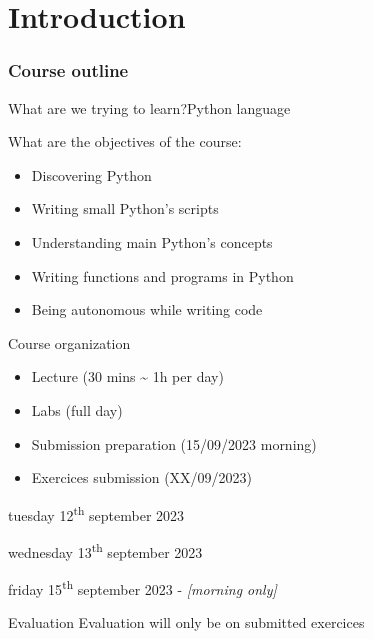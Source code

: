 
\part{Introduction}

\section{Course outline}

\begin{frame}{What are we trying to learn?}{Python language}

  What are the objectives of the course:
  \begin{itemize}
    \item Discovering Python  %
    \item Writing small Python's scripts  %
    \item Understanding main Python's concepts  %
    \item Writing functions and programs in Python  %
    \item Being autonomous while writing code  %
  \end{itemize}

\end{frame}


\begin{frame}{Course organization}

  \begin{itemize}
    \item<1-> Lecture (30 mins \textasciitilde{} 1h per day)
    \item<2-> Labs (full day)
    \item<3-> Submission preparation (15/09/2023 morning)
    \item<4-> Exercices submission (XX/09/2023)
  \end{itemize}

  \medskip

  \begin{center}

     tuesday 12\textsuperscript{th} september 2023

     wednesday 13\textsuperscript{th} september 2023

     friday 15\textsuperscript{th} september 2023 - \textit{[morning only]}

  \end{center}


   \begin{block}{Evaluation}
	Evaluation will only be on submitted exercices
  \end{block}

\end{frame}
